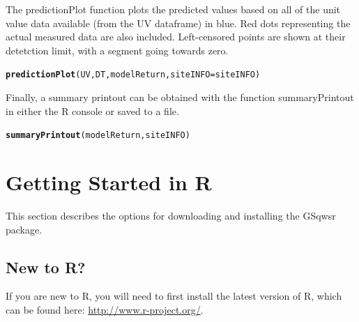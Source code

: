 \documentclass[a4paper,11pt]{article}\usepackage[]{graphicx}\usepackage[]{color}
\makeatletter
\newcommand{\hlkwd}[1]{\textcolor[rgb]{0.737,0.353,0.396}{\textbf{#1}}}%
\newenvironment{kframe}{%
 \def\at@end@of@kframe{}%
 \ifinner\ifhmode%
  \def\at@end@of@kframe{\end{minipage}}%
  \begin{minipage}{\columnwidth}%
 \fi\fi%
 \def\FrameCommand##1{\hskip\@totalleftmargin \hskip-\fboxsep
 \colorbox{shadecolor}{##1}\hskip-\fboxsep
     \hskip-\linewidth \hskip-\@totalleftmargin \hskip\columnwidth}%
 \MakeFramed {\advance\hsize-\width
   \@totalleftmargin\z@ \linewidth\hsize
   \@setminipage}}%
 {\par\unskip\endMakeFramed%
 \at@end@of@kframe}
\newenvironment{knitrout}{}{} %
\makeatother
\begin{document}
\FloatBarrier

The predictionPlot function plots the predicted values based on all of the unit value data available (from the UV dataframe) in blue. Red dots representing the actual measured data are also included. Left-censored points are shown at their detetction limit, with a segment going towards zero.


\begin{knitrout}
\color{fgcolor}\begin{kframe}
\begin{alltt}
\hlkwd{predictionPlot}(UV,DT,modelReturn,siteINFO=siteINFO)
\end{alltt}


{\ttfamily\noindent\bfseries\color{errorcolor}{Error: object 'modelReturn' not found}}\end{kframe}
\end{knitrout}


\FloatBarrier
Finally, a summary printout can be obtained with the function summaryPrintout in either the R console or saved to a file.

\begin{knitrout}
\color{fgcolor}\begin{kframe}
\begin{alltt}
\hlkwd{summaryPrintout}(modelReturn, siteINFO)
\end{alltt}


{\ttfamily\noindent\bfseries\color{errorcolor}{Error: object 'modelReturn' not found}}\end{kframe}
\end{knitrout}


\clearpage
\appendix

\section{Getting Started in R}
\label{sec:appendix1}
This section describes the options for downloading and installing the GSqwsr package.

\subsection{New to R?}
If you are new to R, you will need to first install the latest version of R, which can be found here: \url{http://www.r-project.org/}.
\end{document}
